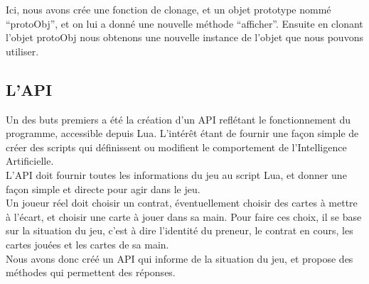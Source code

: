 \documentclass[a4paper]{report}
\begin{document}
Ici, nous avons crée une fonction de clonage, et un objet prototype nommé “protoObj”, et on lui a donné une nouvelle méthode “afficher”. Ensuite en clonant l’objet protoObj nous obtenons une nouvelle instance de l’objet que nous pouvons utiliser.


		\subsection{L’API}
			Un des buts premiers a été la création d’un API reflétant le fonctionnement du programme, accessible depuis Lua. L’intérêt étant de fournir une façon simple de créer des scripts 				qui définissent ou modifient le comportement de l’Intelligence Artificielle.\\

			L’API doit fournir toutes les informations du jeu au script Lua, et donner une façon simple et directe pour agir dans le jeu.\\

			Un joueur réel doit choisir un contrat, éventuellement choisir des cartes à mettre à l’écart, et choisir une carte à jouer dans sa main. Pour faire ces choix, il se base sur la 				situation du jeu, c’est à dire l’identité du preneur, le contrat en cours, les cartes jouées et les cartes de sa main.\\

			Nous avons donc créé un API qui informe de la situation du jeu, et propose des méthodes qui permettent des réponses.\\
\end{document}
